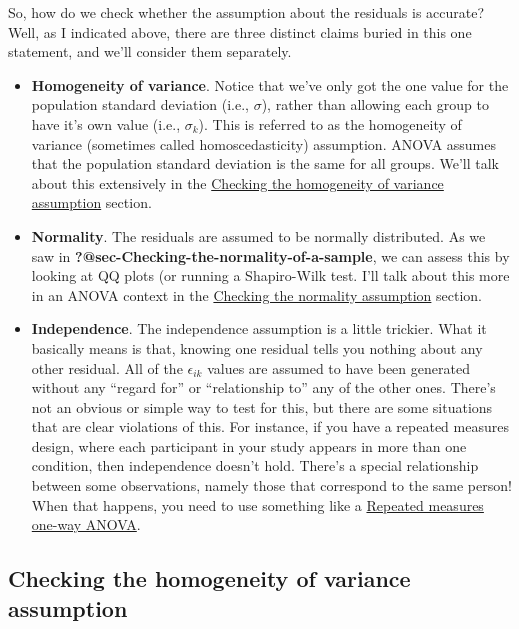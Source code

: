 \documentclass[
  a4paper,
]{book}
\providecommand{\tightlist}{%
  \setlength{\itemsep}{0pt}\setlength{\parskip}{0pt}}\usepackage{longtable,booktabs,array}
\begin{document}
So, how do we check whether the assumption about the residuals is
accurate? Well, as I indicated above, there are three distinct claims
buried in this one statement, and we'll consider them separately.

\begin{itemize}
\tightlist
\item
  \textbf{Homogeneity of variance}. Notice that we've only got the one
  value for the population standard deviation (i.e., \(\sigma\)), rather
  than allowing each group to have it's own value (i.e., \(\sigma_k\)).
  This is referred to as the homogeneity of variance (sometimes called
  homoscedasticity) assumption. ANOVA assumes that the population
  standard deviation is the same for all groups. We'll talk about this
  extensively in the
  \protect\hyperlink{sec-Checking-the-homogeneity-of-variance-assumption}{Checking
  the homogeneity of variance assumption} section.
\item
  \textbf{Normality}. The residuals are assumed to be normally
  distributed. As we saw in
  \textbf{?@sec-Checking-the-normality-of-a-sample}, we can assess this
  by looking at QQ plots (or running a Shapiro-Wilk test. I'll talk
  about this more in an ANOVA context in the
  \protect\hyperlink{sec-Checking-the-normality-assumption}{Checking the
  normality assumption} section.
\item
  \textbf{Independence}. The independence assumption is a little
  trickier. What it basically means is that, knowing one residual tells
  you nothing about any other residual. All of the \(\epsilon_{ik}\)
  values are assumed to have been generated without any ``regard for''
  or ``relationship to'' any of the other ones. There's not an obvious
  or simple way to test for this, but there are some situations that are
  clear violations of this. For instance, if you have a repeated
  measures design, where each participant in your study appears in more
  than one condition, then independence doesn't hold. There's a special
  relationship between some observations, namely those that correspond
  to the same person! When that happens, you need to use something like
  a \protect\hyperlink{repeated-measures-one-way-anova}{Repeated
  measures one-way ANOVA}.
\end{itemize}

\hypertarget{sec-Checking-the-homogeneity-of-variance-assumption}{%
\subsection{Checking the homogeneity of variance
assumption}\label{sec-Checking-the-homogeneity-of-variance-assumption}}
\end{document}
